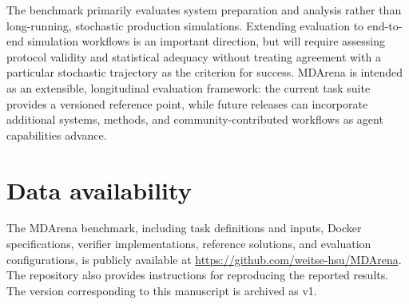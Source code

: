 The benchmark primarily evaluates system preparation and analysis rather than long-running, stochastic production simulations. Extending evaluation to end-to-end simulation workflows is an important direction, but will require assessing protocol validity and statistical adequacy without treating agreement with a particular stochastic trajectory as the criterion for success. MDArena is intended as an extensible, longitudinal evaluation framework: the current task suite provides a versioned reference point, while future releases can incorporate additional systems, methods, and community-contributed workflows as agent capabilities advance.


\section*{Data availability}


The MDArena benchmark, including task definitions and inputs, Docker specifications, verifier implementations, reference solutions, and evaluation configurations, is publicly available at
\url{https://github.com/weitse-hsu/MDArena}. The repository also provides instructions for reproducing
the reported results. The version corresponding to this manuscript is archived as v1.

